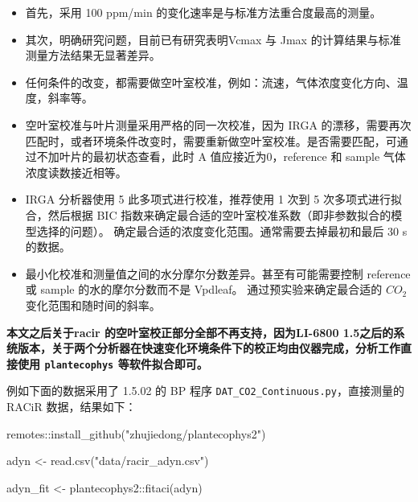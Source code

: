\documentclass[
]{krantz}
\makeatletter
\newenvironment{Shaded}{\begin{snugshade}}{\end{snugshade}}
\newcommand{\FunctionTok}[1]{\textcolor[rgb]{0.00,0.00,0.00}{#1}}
\newcommand{\NormalTok}[1]{#1}
\newcommand{\OtherTok}[1]{\textcolor[rgb]{0.56,0.35,0.01}{#1}}
\newcommand{\SpecialCharTok}[1]{\textcolor[rgb]{0.00,0.00,0.00}{#1}}
\newcommand{\StringTok}[1]{\textcolor[rgb]{0.31,0.60,0.02}{#1}}
\providecommand{\tightlist}{%
  \setlength{\itemsep}{0pt}\setlength{\parskip}{0pt}}
\newenvironment{kframe}{%
\medskip{}
\setlength{\fboxsep}{.8em}
 \def\at@end@of@kframe{}%
 \ifinner\ifhmode%
  \def\at@end@of@kframe{\end{minipage}}%
  \begin{minipage}{\columnwidth}%
 \fi\fi%
 \def\FrameCommand##1{\hskip\@totalleftmargin \hskip-\fboxsep
 \colorbox{shadecolor}{##1}\hskip-\fboxsep
     \hskip-\linewidth \hskip-\@totalleftmargin \hskip\columnwidth}%
 \MakeFramed {\advance\hsize-\width
   \@totalleftmargin\z@ \linewidth\hsize
   \@setminipage}}%
 {\par\unskip\endMakeFramed%
 \at@end@of@kframe}
\renewenvironment{Shaded}{\begin{kframe}}{\end{kframe}}
\makeatother
\begin{document}
\begin{itemize}
\tightlist
\item
  首先，采用 100 ppm/min 的变化速率是与标准方法重合度最高的测量。
\item
  其次，明确研究问题，目前已有研究表明Vcmax 与 Jmax 的计算结果与标准测量方法结果无显著差异。
\item
  任何条件的改变，都需要做空叶室校准，例如：流速，气体浓度变化方向、温度，斜率等。
\item
  空叶室校准与叶片测量采用严格的同一次校准，因为 IRGA 的漂移，需要再次匹配时，或者环境条件改变时，需要重新做空叶室校准。是否需要匹配，可通过不加叶片的最初状态查看，此时 A 值应接近为0，reference 和 sample 气体浓度读数接近相等。
\item
  IRGA 分析器使用 5 此多项式进行校准，推荐使用 1 次到 5 次多项式进行拟合，然后根据 BIC 指数来确定最合适的空叶室校准系数（即非参数拟合的模型选择的问题）。
  确定最合适的浓度变化范围。通常需要去掉最初和最后 30 s的数据。
\item
  最小化校准和测量值之间的水分摩尔分数差异。甚至有可能需要控制 reference 或 sample 的水的摩尔分数而不是 Vpdleaf。
  通过预实验来确定最合适的 \(CO_2\) 变化范围和随时间的斜率。
\end{itemize}

\textbf{本文之后关于racir 的空叶室校正部分全部不再支持，因为LI-6800 1.5之后的系统版本，关于两个分析器在快速变化环境条件下的校正均由仪器完成，分析工作直接使用 \texttt{plantecophys} 等软件拟合即可。}

例如下面的数据采用了 1.5.02 的 BP 程序 \texttt{DAT\_CO2\_Continuous.py}，直接测量的 RACiR 数据，结果如下：

\begin{Shaded}
\begin{Highlighting}[]
\NormalTok{remotes}\SpecialCharTok{::}\FunctionTok{install\_github}\NormalTok{(}\StringTok{"zhujiedong/plantecophys2"}\NormalTok{)}
\end{Highlighting}
\end{Shaded}

\begin{Shaded}
\begin{Highlighting}[]
\NormalTok{adyn }\OtherTok{\textless{}{-}} \FunctionTok{read.csv}\NormalTok{(}\StringTok{"data/racir\_adyn.csv"}\NormalTok{)}

\NormalTok{adyn\_fit }\OtherTok{\textless{}{-}}\NormalTok{ plantecophys2}\SpecialCharTok{::}\FunctionTok{fitaci}\NormalTok{(adyn)}
\end{Highlighting}
\end{Shaded}
\end{document}
